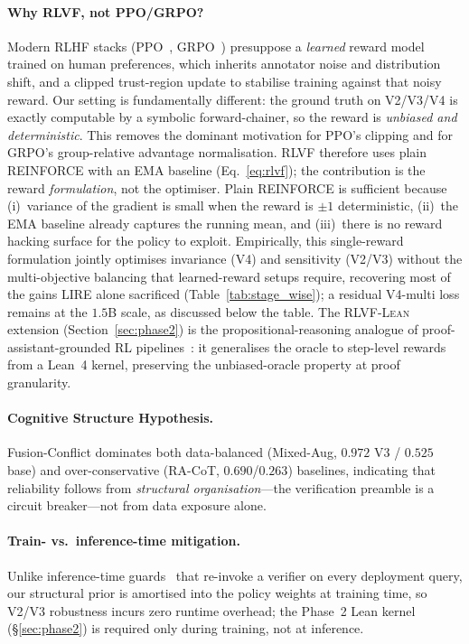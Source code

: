 \documentclass{article}
\begin{document}
\paragraph{Why \textsc{RLVF}, not PPO/GRPO?} Modern RLHF stacks (PPO~\citep{schulman2017proximal}, GRPO~\citep{shao2024deepseekmath}) presuppose a \emph{learned} reward model trained on human preferences, which inherits annotator noise and distribution shift, and a clipped trust-region update to stabilise training against that noisy reward. Our setting is fundamentally different: the ground truth on V2/V3/V4 is exactly computable by a symbolic forward-chainer, so the reward is \emph{unbiased and deterministic}. This removes the dominant motivation for PPO's clipping and for GRPO's group-relative advantage normalisation. \textsc{RLVF} therefore uses plain REINFORCE with an EMA baseline (Eq.~\ref{eq:rlvf}); the contribution is the reward \emph{formulation}, not the optimiser. Plain REINFORCE is sufficient because (i)~variance of the gradient is small when the reward is $\pm 1$ deterministic, (ii)~the EMA baseline already captures the running mean, and (iii)~there is no reward hacking surface for the policy to exploit. Empirically, this single-reward formulation jointly optimises invariance (V4) and sensitivity (V2/V3) without the multi-objective balancing that learned-reward setups require, recovering most of the gains LIRE alone sacrificed (Table~\ref{tab:stage_wise}); a residual V4-multi loss remains at the $1.5$B scale, as discussed below the table. The \textsc{RLVF-Lean} extension (Section~\ref{sec:phase2}) is the propositional-reasoning analogue of proof-assistant-grounded RL pipelines~\citep{deepseekprover2024,leanabell2025,alphaproof2024}: it generalises the oracle to step-level rewards from a Lean~4 kernel, preserving the unbiased-oracle property at proof granularity.

\paragraph{Cognitive Structure Hypothesis.} Fusion-Conflict dominates both data-balanced (Mixed-Aug, $0.972$ V3 / $0.525$ base) and over-conservative (RA-CoT, $0.690$/$0.263$) baselines, indicating that reliability follows from \emph{structural organisation}---the verification preamble is a circuit breaker---not from data exposure alone.

\paragraph{Train- vs.\ inference-time mitigation.} Unlike inference-time guards~\citep{vericot2026,xiong2025deliberate,premiseRAG2025} that re-invoke a verifier on every deployment query, our structural prior is amortised into the policy weights at training time, so V2/V3 robustness incurs zero runtime overhead; the Phase~2 Lean kernel (\S\ref{sec:phase2}) is required only during training, not at inference.
\end{document}
